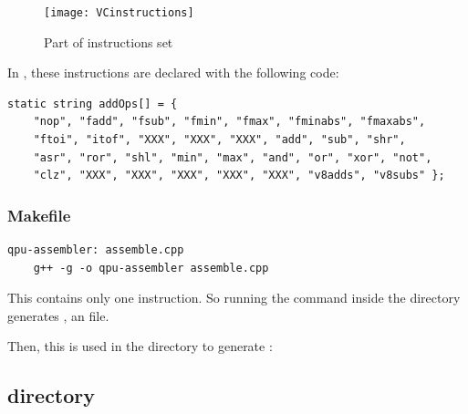\begin{figure}[!htbp]
	\centering
	\texttt{[image: VCinstructions]}
	\caption{Part of \vc{} instructions set}
	\label{VCinstructionsFigure}
\end{figure}
\FloatBarrier

In , these instructions are declared with the following  code:

\begin{lstlisting}
static string addOps[] = {
    "nop", "fadd", "fsub", "fmin", "fmax", "fminabs", "fmaxabs",
    "ftoi", "itof", "XXX", "XXX", "XXX", "add", "sub", "shr",
    "asr", "ror", "shl", "min", "max", "and", "or", "xor", "not",
    "clz", "XXX", "XXX", "XXX", "XXX", "XXX", "v8adds", "v8subs" };
\end{lstlisting}



\subsubsection{Makefile}

\begin{lstlisting}
qpu-assembler: assemble.cpp
	g++ -g -o qpu-assembler assemble.cpp
\end{lstlisting}

This  contains only one instruction. So running the  command inside the  directory generates , an  file.
\vspace{5 mm}

Then, this  is used in the  directory to generate :

\vspace{5 mm}



\subsection{ directory}

